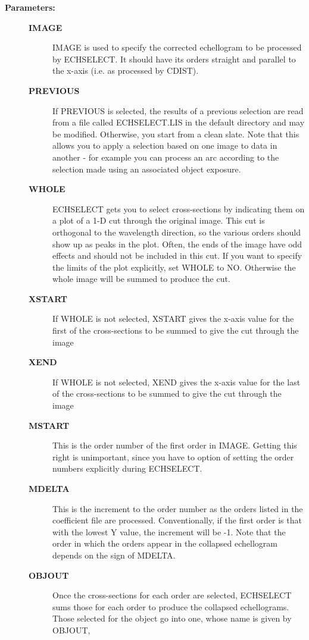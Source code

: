 \begin{description}
\begin{description}
\item [\textbf{Parameters:}]
\begin{description}
\item [\textbf{IMAGE}]
 IMAGE is used to specify the corrected echellogram to be processed by
 ECHSELECT.  It should have its orders straight and parallel to the
 x-axis (i.e. as processed by CDIST).
\item [\textbf{PREVIOUS}]
 If PREVIOUS is selected, the results of a previous selection are read
 from a file called ECHSELECT.LIS in the default directory and may be
 modified.  Otherwise, you start from a clean slate.  Note that this
 allows you to apply a selection based on one image to data in another
 - for example you can process an arc according to the selection made
 using an associated object exposure.
\item [\textbf{WHOLE}]
 ECHSELECT gets you to select cross-sections by indicating them on a
 plot of a 1-D cut through the original image.  This cut is orthogonal
 to the wavelength direction, so the various orders should show up as
 peaks in the plot.  Often, the ends of the image have odd effects and
 should not be included in this cut.  If you want to specify the
 limits of the plot explicitly, set WHOLE to NO. Otherwise the whole
 image will be summed to produce the cut.
\item [\textbf{XSTART}]
 If WHOLE is not selected, XSTART gives the x-axis value for the first
 of the cross-sections to be summed to give the cut through the image
\item [\textbf{XEND}]
 If WHOLE is not selected, XEND gives the x-axis value for the last of
 the cross-sections to be summed to give the cut through the image
\item [\textbf{MSTART}]
 This is the order number of the first order in IMAGE. Getting this
 right is unimportant, since you have to option of setting the order
 numbers explicitly during ECHSELECT.
\item [\textbf{MDELTA}]
 This is the increment to the order number as the orders listed in the
 coefficient file are processed. Conventionally, if the first order is
 that with the lowest Y value, the increment will be -1.  Note that
 the order in which the orders appear in the collapsed echellogram
 depends on the sign of MDELTA.
\item [\textbf{OBJOUT}]
 Once the cross-sections for each order are selected, ECHSELECT sums
 those for each order to produce the collapsed echellograms.  Those
 selected for the object go into one, whose name is given by OBJOUT,

\end{description}
\end{description}
\end{description}
